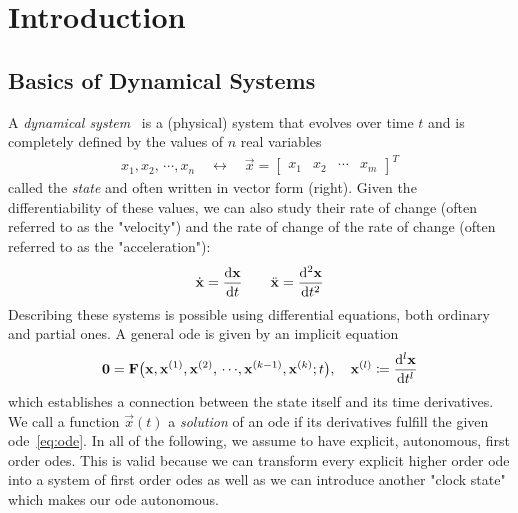 \chapter{Introduction}
\label{c:introduction}





\section{Basics of Dynamical Systems}

	A \emph{dynamical system}~\cite{birkhoffDynamicalSystems1927} is a (physical) system that evolves over time \(t\) and is completely defined by the values of \(n\) real variables
	\begin{align*}
		x_1, x_2, \,\cdots\!, x_n \quad\longleftrightarrow\quad \vec{x} = \begin{bmatrix} x_1 & x_2 & \cdots & x_m \end{bmatrix}^T
	\end{align*}
	called the \emph{state} and often written in vector form (right). Given the differentiability of these values, we can also study their rate of change (often referred to as the "velocity") and the rate of change of the rate of change (often referred to as the "acceleration"):
	\begin{align*}
		\dot{\boldsymbol{\mathrm{x}}} = \dv{\boldsymbol{\mathrm{x}}}{t} \qquad \ddot{\boldsymbol{\mathrm{x}}} = \dv[2]{\boldsymbol{\mathrm{x}}}{t}
	\end{align*}
	Describing these systems is possible using differential equations, both ordinary and partial ones. A general \ac{ode} is given by an implicit equation
	\begin{align}
		\boldsymbol{\mathrm{0}} = \boldsymbol{\mathrm{F}}\big( \boldsymbol{\mathrm{x}}, \boldsymbol{\mathrm{x}}^{(1)}, \boldsymbol{\mathrm{x}}^{(2)}, \,\cdots\!, \boldsymbol{\mathrm{x}}^{(k - 1)}, \boldsymbol{\mathrm{x}}^{(k)}; t \big),\quad \boldsymbol{\mathrm{x}}^{(l)} \coloneqq \dv[l]{\boldsymbol{\mathrm{x}}}{t}  \label{eq:ode}
	\end{align}
	which establishes a connection between the state itself and its time derivatives. We call a function \( \vec{x}(t) \) a \emph{solution} of an \ac{ode} if its derivatives fulfill the given \ac{ode}~\eqref{eq:ode}. In all of the following, we assume to have explicit, autonomous, first order \acp{ode}. This is valid because we can transform every explicit higher order \ac{ode} into a system of first order \acp{ode} as well as we can introduce another "clock state" which makes our \ac{ode} autonomous.

